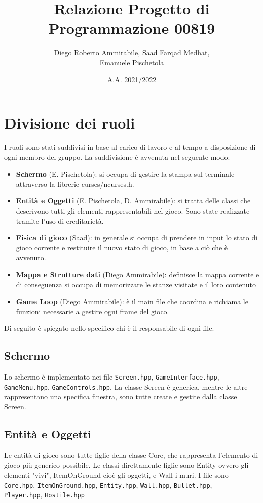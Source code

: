 \documentclass{article}
\title{Relazione Progetto di Programmazione 00819}
\author{Diego Roberto Ammirabile, Saad Farqad Medhat, \\Emanuele Pischetola}
\date{A.A. 2021/2022}
\begin{document}
\maketitle

\section{Divisione dei ruoli}
I ruoli sono stati suddivisi in base al carico di lavoro e al tempo a disposizione di ogni membro del gruppo.
La suddivisione è avvenuta nel seguente modo:
\begin{itemize}
\item \textbf{Schermo} (E. Pischetola): si occupa di gestire la stampa sul terminale attraverso la librerie curses/ncurses.h.
\item \textbf{Entità e Oggetti} (E. Pischetola, D. Ammirabile): si tratta delle classi che descrivono tutti gli elementi rappresentabili nel gioco. Sono state realizzate tramite l'uso di ereditarietà.
\item \textbf{Fisica di gioco} (Saad): in generale si occupa di prendere in input lo stato di gioco corrente e restituire il nuovo stato di gioco, in base a ciò che è avvenuto.
\item \textbf{Mappa e Strutture dati} (Diego Ammirabile): definisce la mappa corrente e di conseguenza si occupa di memorizzare le stanze visitate e il loro contenuto
\item \textbf{Game Loop} (Diego Ammirabile): è il main file che coordina e richiama le funzioni necessarie a gestire ogni frame del gioco.
\end{itemize}

Di seguito è spiegato nello specifico chi è il responsabile di ogni file.

\subsection{Schermo}
Lo schermo è implementato nei file \texttt{Screen.hpp}, \texttt{GameInterface.hpp}, \\\texttt{GameMenu.hpp}, \texttt{GameControls.hpp}. La classe Screen è generica, mentre le altre rappresentano una specifica finestra, sono tutte create e gestite dalla classe Screen.

\subsection{Entità e Oggetti}
Le entità di gioco sono tutte figlie della classe Core, che rappresenta l'elemento di gioco più generico possibile. Le classi direttamente figlie sono Entity ovvero gli elementi "vivi", ItemOnGround cioè gli oggetti, e Wall i muri. 
I file sono \texttt{Core.hpp}, \texttt{ItemOnGround.hpp}, \texttt{Entity.hpp}, \texttt{Wall.hpp}, \texttt{Bullet.hpp}, \\\texttt{Player.hpp}, \texttt{Hostile.hpp}
\end{document}
